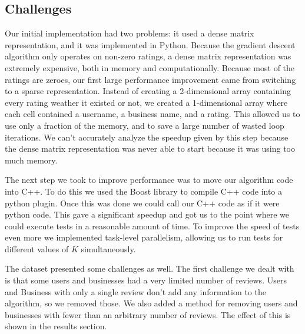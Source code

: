 \subsection{Challenges}

Our initial implementation had two problems: it used a dense matrix
representation, and it was implemented in Python. Because the gradient descent
algorithm only operates on non-zero ratings, a dense matrix representation was
extremely expensive, both in memory and computationally. Because most of the
ratings are zeroes, our first large performance improvement came from switching
to a sparse representation. Instead of creating a 2-dimensional array containing
every rating weather it existed or not, we created a 1-dimensional array where
each cell contained a username, a business name, and a rating. This allowed us
to use only a fraction of the memory, and to save a large number of wasted loop
iterations. We can't accurately analyze the speedup given by this step because
the dense matrix representation was never able to start because it was using too
much memory. 

The next step we took to improve performance was to move our algorithm code into
C++. To do this we used the Boost library to compile C++ code into a python
plugin. Once this was done we could call our C++ code as if it were python code.
This gave a significant speedup and got us to the point where we could execute
tests in a reasonable amount of time. To improve the speed of tests even more we
implemented task-level parallelism, allowing us to run tests for different
values of $K$ simultaneously.

The dataset presented some challenges as well. The first challenge we dealt with
is that some users and businesses had a very limited number of reviews. Users
and Business with only a single review don't add any information to the
algorithm, so we removed those. We also added a method for removing users and
businesses with fewer than an arbitrary number of reviews. The effect of this is
shown in the results section.

